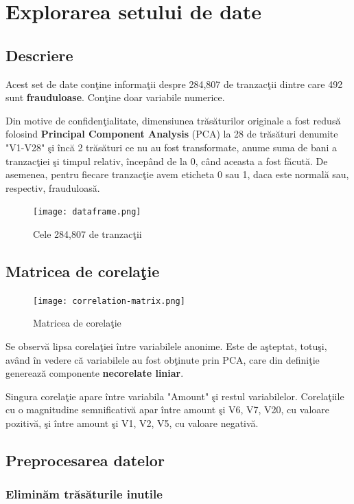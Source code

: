 \chapter{Explorarea setului de date}

\section{Descriere}

Acest set de date\cite{kaggle-dataset} conţine informaţii despre 284,807 de tranzacţii dintre care 
492 sunt \textbf{frauduloase}. Conţine doar variabile numerice.

Din motive de confidenţialitate, dimensiunea trăsăturilor originale a fost 
redusă folosind \textbf{Principal Component Analysis} (PCA) la 28 de trăsături denumite 
"V1-V28" şi încă 2 trăsături ce nu au fost transformate, anume suma de bani
a tranzacţiei şi timpul relativ, începând de la 0, când aceasta a fost făcută. 
De asemenea, pentru fiecare tranzacţie avem eticheta 0 sau 1, daca este normală 
sau, respectiv, frauduloasă.

\begin{figure}[H]
    \texttt{[image: dataframe.png]}
    \caption{Cele 284,807 de tranzacţii}
\end{figure}


\section{Matricea de corelaţie}

\begin{figure}[H]
    \texttt{[image: correlation-matrix.png]}
    \caption{Matricea de corelaţie}
\end{figure}

Se observă lipsa corelaţiei între variabilele anonime. Este de aşteptat, totuşi, 
având în vedere că variabilele au fost obţinute prin PCA, care din definiţie generează 
componente \textbf{necorelate liniar}.

Singura corelaţie apare între variabila "Amount" şi restul variabilelor. Corelaţiile
cu o magnitudine semnificativă apar între amount şi V6, V7, V20, cu valoare pozitivă, 
şi între amount şi V1, V2, V5, cu valoare negativă.

\section{Preprocesarea datelor}

\subsection{Eliminăm trăsăturile inutile}

